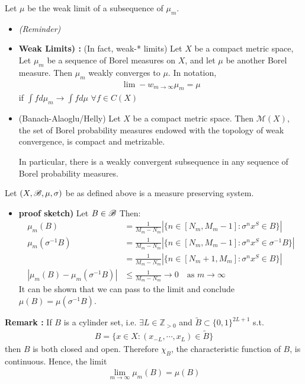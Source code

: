 \documentclass[12pt,a4paper]{report}
\begin{document}
Let $\mu$ be the weak limit of a subsequence of $\mu_m$.
\s

\begin{itemize}
\item[ ] \textsl{(Reminder)}

\item \textbf{Weak Limits) : }(In fact, weak-* limits) Let $X$ be a compact metric space, Let $\mu_m$ be a sequence of Borel measures on $X$, and let $\mu$ be another Borel measure. Then $\mu_m$ weakly converges to $\mu$. In notation,
\begin{align*}
\lim-w_{m\rightarrow \infty} \mu_m = \mu
\end{align*}
if $\int f d\mu_m \rightarrow \int f d\mu$ $\forall f\in C(X)$

\item \thm (Banach-Alaoglu/Helly) Let $X$ be a compact metric space. Then $\mathscr{M}(X)$, the set of Borel probability measures endowed with the topology of weak convergence, is compact and metrizable.

In particular, there is a weakly convergent subsequence in any sequence of Borel probability measures.
\end{itemize}
\s

\lem Let $(X,\mathscr{B}, \mu, \sigma)$ be as defined above is a measure preserving system.
\begin{itemize}
\item[ ] \textbf{proof sketch)} Let $B\in \mathscr{B}$ Then:
\begin{align*}
\mu_m(B) &= \frac{1}{M_m-N_m} |\{ n \in [N_m, M_m-1] : \sigma^n x^S \in B \}  | \\
\mu_m(\sigma^{-1}B) &= \frac{1}{M_m-N_m} | \{n\in [N_m, M_m -1]:\sigma^n x^S \in \sigma^{-1} B \} | \\
&= \frac{1}{M_m-N_m} | \{n\in [N_m +1, M_m]:\sigma^n x^S \in B \} | \\
|\mu_m(B) - \mu_m(\sigma^{-1}B)| &\leq \frac{1}{M_m-N_m} \rightarrow 0 \quad \text{as } m\rightarrow \infty
\end{align*} 
It can be shown that we can pass to the limit and conclude $\mu (B) = \mu(\sigma^{-1}B)$.
\end{itemize}
\s

\bull \textbf{Remark :} If $B$ is a cylinder set, i.e. $\exists L \in \mathbb{Z}_{>0}$ and $\tilde{B} \subset \{0,1\}^{2L+1}$ s.t.
\begin{align*}
B = \{ x\in X : (x_{-L},\cdots,x_L) \in \tilde{B} \}
\end{align*}
then $B$ is both closed and open. Therefore $\chi_B$, the characteristic function of $B$, is continuous. Hence, the limit
\begin{align*}
\lim_{m\rightarrow \infty} \mu_m(B) = \mu(B)
\end{align*}
\s
\end{document}
